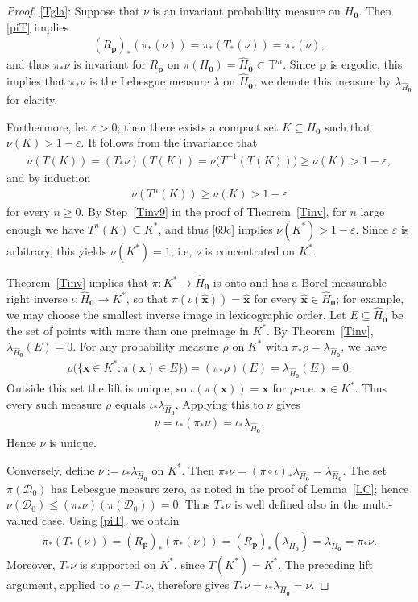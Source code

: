 \documentclass[11pt,reqno,tbtags,a4paper]{amsart}
\numberwithin{equation}{section}
\renewcommand\le{\leq}
\renewcommand\ge{\geq}
\renewcommand\leq{\leqslant}
\renewcommand\geq{\geqslant}
\theoremstyle{plain}%
\theoremstyle{definition}
\theoremstyle{remark}
\newcommand\pfitemx[1]{\par#1:}
\newcommand\pfitemref[1]{\pfitemx{\ref{#1}}}
\newcommand{\refT}[1]{Theorem~\ref{#1}}
\newcommand{\refL}[1]{Lemma~\ref{#1}}
\newcommand{\refStep}[1]{Step~\ref{#1}}
\newcommand\bigpar[1]{\bigl(#1\bigr)}
\newcommand\punkt{\xperiod}    %
\newcommand\ie{i.e\punkt}
\newcommand\bbT{\mathbb T}
\newcommand\gl{\lambda}
\newcommand\eps{\varepsilon}
\newcommand\cD{\mathcal D}
\newcommand\qw{^{-1}}
\newcommand\Ho{H_{\0}}
\newcommand\hHo{\hH_{\0}}
\newcommand\vp{\mathbf{p}}
\newcommand\vx{\mathbf{x}}
\newcommand\hvx{\hat{\mathbf{x}}}
\newcommand\Rp{R_\vp}
\newcommand\hH{\widehat{H}}
\newcommand\Kx{K^*}
\newcommand\stj{_*}
\newcommand\glhHo{\gl_{\hHo}}
\newcommand\0{{\boldsymbol 0}}
\newcommand\1{{\boldsymbol 1}}
\begin{document}
\begin{proof}
\pfitemref{Tgla}
Suppose that $\nu$ is an invariant  probability measure on $\Ho$. 
Then \eqref{piT} implies
\begin{align}\label{69a}
(\Rp)\stj(\pi\stj(\nu))
=\pi\stj(T\stj(\nu))=\pi\stj(\nu),
\end{align}
and thus $\pi\stj\nu$ is invariant for $\Rp$ on $\pi(\Ho)=\hHo\subset\bbT^m$.
Since $\vp$ is ergodic, this implies that $\pi\stj\nu$ is the Lebesgue
measure $\gl$ on $\hHo$; we denote this measure by $\glhHo$ for clarity.

Furthermore, let $\eps>0$; then there exists a compact set $K\subseteq\Ho$
such that $\nu(K)>1-\eps$. 
It follows from the invariance that
\begin{align}\label{69b}
\nu(T(K))=  (T\stj\nu)(T(K)) = \nu\bigpar{T\qw(T(K))}
\ge \nu(K) > 1-\eps,
\end{align}
and by induction
\begin{align}\label{69c}
  \nu(T^n(K))\ge \nu(K)>1-\eps
\end{align}
for every $n\ge0$.
By \refStep{Tinv9} in the proof of \refT{Tinv}, 
for $n$ large enough we have $T^n(K)\subseteq\Kx$, and thus
\eqref{69c} implies $\nu(\Kx)>1-\eps$. Since $\eps$ is arbitrary, this
yields $\nu(\Kx)=1$, \ie, $\nu$ is concentrated on $\Kx$.

\refT{Tinv} implies that $\pi:\Kx\to\hHo$ is onto and has a Borel
measurable right inverse $\iota:\hHo\to\Kx$, so that
$\pi(\iota(\hvx))=\hvx$ for every $\hvx\in\hHo$;
for example, we may choose the smallest inverse image in lexicographic
order.
Let $E\subseteq\hHo$ be the set of points with more than one preimage
in $\Kx$. By \refT{Tinv}, $\glhHo(E)=0$.
For any probability measure $\rho$ on $\Kx$ with
$\pi\stj\rho=\glhHo$, we have
\begin{align}
 \rho\bigpar{\{\vx\in\Kx:\pi(\vx)\in E\}}
 =(\pi\stj\rho)(E)=\glhHo(E)=0.
\end{align}
Outside this set the lift is unique, so $\iota(\pi(\vx))=\vx$ for
$\rho$-a.e. $\vx\in\Kx$. Thus every such measure $\rho$ equals
$\iota\stj\glhHo$.
Applying this to $\nu$ gives
\begin{align}\label{69d}
  \nu=\iota\stj(\pi\stj\nu)
=\iota\stj\glhHo.
\end{align}
Hence $\nu$ is unique.

Conversely, define $\nu:=\iota\stj\glhHo$ on $\Kx$.
Then $\pi\stj\nu=(\pi\circ\iota)\stj\glhHo=\glhHo$.
The set $\pi(\cD_0)$ has Lebesgue measure zero, as noted in the proof of
\refL{LC}; hence
$\nu(\cD_0)\le(\pi\stj\nu)(\pi(\cD_0))=0$.
Thus $T\stj\nu$ is well defined also in the multi-valued case.
Using \eqref{piT}, we obtain
\begin{align}\label{69e}
  \pi\stj(T\stj(\nu))=(\Rp)\stj(\pi\stj(\nu))=(\Rp)\stj(\glhHo)
=\glhHo
=\pi\stj\nu.
\end{align}
Moreover, $T\stj\nu$ is supported on $\Kx$, since $T(\Kx)=\Kx$.
The preceding lift argument, applied to $\rho=T\stj\nu$, therefore gives
$T\stj\nu=\iota\stj\glhHo=\nu$.


\end{proof}
\end{document}
